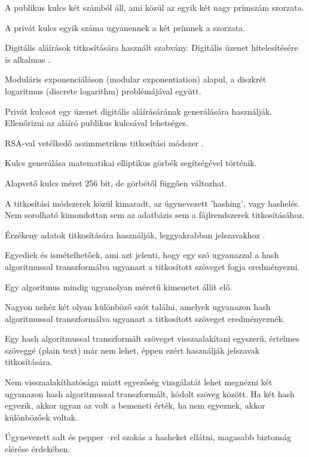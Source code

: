 A publikus kulcs két számból áll, ami közül az egyik két nagy prímszám szorzata.

A privát kulcs egyik száma ugyanennek a két prímnek a szorzata.


\noindent Digitális aláírások titkosítására használt szabvány. Digitális üzenet hitelesítésére is alkalmas \cite{yassein2017comprehensive}.

Moduláris exponenciáláson (modular exponentiation) alapul, a diszkrét logaritmus (discrete logarithm) problémájával együtt.

Privát kulcsot egy üzenet digitális aláírásárának generálására használják. Ellenőrizni az aláíró publikus kulcsával lehetséges.


\noindent RSA-val vetélkedő aszimmetrikus titkosítási módszer \cite{gupta2011ecc}.

Kulcs generálása matematikai elliptikus görbék segítségével történik.

Alapvető kulcs méret 256 bit, de görbétől függően változhat.

A titkosítási módszerek közül kimaradt, az úgynevezett 'hashing', vagy hashelés. Nem sorolható kimondottan sem az adatbázis sem a fájlrendszerek titkosításához. 

Érzékeny adatok titkosítására használják, leggyakrabban jelszavakhoz \cite{dang2008recommendation}.

Egyediek és ismételhetőek, ami azt jelenti, hogy egy szó ugyanazzal a hash algoritmussal transzformálva ugyanazt a titkosított szöveget fogja eredményezni. 

Egy algoritmus mindig ugyanolyan méretű kimenetet állít elő. 

Nagyon nehéz két olyan különböző szót találni, amelyek ugyanazon hash algoritmussal transzformálva ugyanazt a titkosított szöveget eredményeznék.

Egy hash algoritmussal transzformált szöveget visszaalakítani egyszerű, értelmes szöveggé (plain text) már nem lehet, éppen ezért használják jelszavak titkosítására.

Nem visszaalakíthatósága miatt egyezőség vizsgálatát lehet megnézni két ugyanazon hash algoritmussal transzformált, kódolt szöveg között. Ha két hash egyezik, akkor ugyan az volt a bemeneti érték, ha nem egyeznek, akkor különbözőek voltak.

Úgynevezett salt és pepper –rel szokás a hasheket ellátni, magasabb biztonság elérése érdekében.

